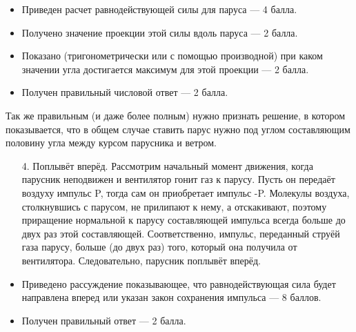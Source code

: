 \additionalCriteria

\begin{itemize}
    \item Приведен расчет равнодействующей силы для паруса — 4 балла.
    \item Получено значение проекции этой силы вдоль паруса — 2 балла.
    \item Показано (тригонометрически или с помощью производной) при каком значении угла достигается 
    максимум для этой проекции — 2 балла.
    \item Получен правильный числовой ответ — 2 балла.
\end{itemize}

Так же правильным (и даже более полным) нужно признать решение, в котором показывается, что в общем 
случае ставить парус нужно под углом составляющим половину угла между курсом парусника и ветром.

\begin{enumerate}
    \item[4.] Поплывёт вперёд. Рассмотрим начальный момент движения, когда парусник неподвижен и вентилятор гонит газ к парусу. Пусть он передаёт воздуху импульс P, тогда сам он приобретает импульс -P.  Молекулы воздуха, столкнувшись с парусом, не прилипают к нему, а отскакивают, поэтому приращение нормальной к парусу составляющей импульса всегда больше до двух раз этой составляющей. Соответственно, импульс, переданный струёй газа парусу, больше (до двух раз) того, который она получила от вентилятора. 
    Следовательно, парусник поплывёт вперёд.

\end{enumerate}

\additionalCriteria

\begin{itemize}
    \item Приведено рассуждение показывающее, что равнодействующая сила будет направлена вперед или указан закон сохранения импульса — 8 баллов.
    \item Получен правильный ответ — 2 балла.
\end{itemize}

